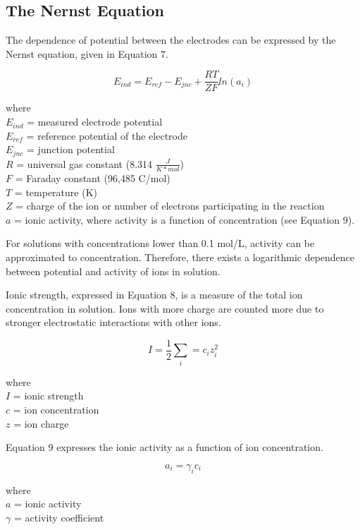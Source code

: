 \documentclass{article}
\begin{document}
\subsection {The Nernst Equation}
The dependence of potential between the electrodes can be expressed by the Nernst
equation, given in Equation 7. \cite{lab_man}
\begin{center}
    \begin{equation}
        E_{ind} = E_{ref} - E_{jnc} + \frac{RT}{ZF}ln(a_i)
    \end{equation}
\end{center}
where \\
$E_{ind}$ = measured electrode potential \\
$E_{ref}$ = reference potential of the electrode \\
$E_{jnc}$ = junction potential \\
$R$ = universal gas constant (8.314 $\frac{J}{K*mol}$) \\
$F$ = Faraday constant (96,485 C/mol) \\
$T$ = temperature (K) \\
$Z$ = charge of the ion or number of electrons participating in the reaction \\
$a$ = ionic activity, where activity is a function of concentration (see
Equation 9).

For solutions with concentrations lower than 0.1 mol/L, activity can be 
approximated to concentration. Therefore, there exists a logarithmic
dependence between potential and activity of ions in solution.

Ionic strength, expressed in Equation 8, is a measure of the total ion concentration in solution. Ions
with more charge are counted more due to stronger electrostatic interactions
with other ions.
\begin{center}
    \begin{equation}
        I = \frac{1}{2}\sum_i = c_iz_i^2
    \end{equation}
\end{center}
where \\
$I$ = ionic strength \\
$c$ = ion concentration \\
$z$ = ion charge

Equation 9 expresses the ionic activity as a function of ion concentration.
\begin{center}
    \begin{equation}
        a_i = \gamma_ic_i
    \end{equation}
\end{center}
where \\
$a$ = ionic activity \\
$\gamma$ = activity coefficient
\end{document}
